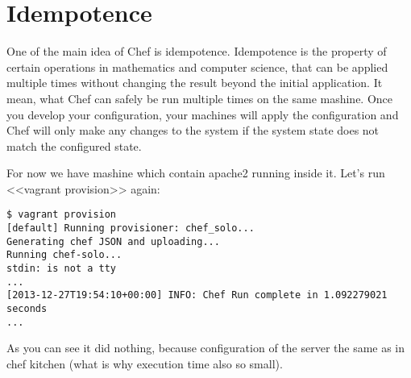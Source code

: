 \section{Idempotence}

One of the main idea of Chef is idempotence. Idempotence is the property of certain operations in mathematics and computer science, that can be applied multiple times without changing the result beyond the initial application. It mean, what Chef can safely be run multiple times on the same mashine. Once you develop your configuration, your machines will apply the configuration and Chef will only make any changes to the system if the system state does not match the configured state.

For now we have mashine which contain apache2 running inside it. Let's run <<vagrant provision>> again:

\begin{lstlisting}[label=lst:my-cloud-idempotence1,title=my-cloud/nodes/Vagrantfile]
$ vagrant provision
[default] Running provisioner: chef_solo...
Generating chef JSON and uploading...
Running chef-solo...
stdin: is not a tty
...
[2013-12-27T19:54:10+00:00] INFO: Chef Run complete in 1.092279021 seconds
...
\end{lstlisting}

As you can see it did nothing, because configuration of the server the same as in chef kitchen (what is why execution time also so small).